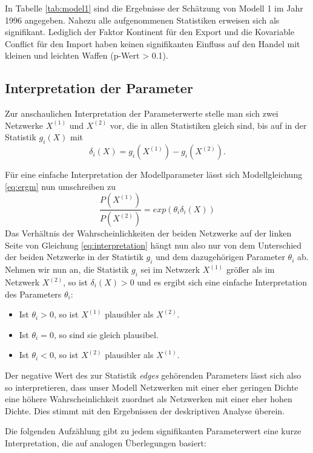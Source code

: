 \documentclass[a4paper,ngerman,oneside,titlepage,bibliography=totoc,11pt]{scrreprt}
\begin{document}
In Tabelle \ref{tab:model1} sind die Ergebnisse der Schätzung von Modell 1 im Jahr 1996 angegeben. Nahezu alle aufgenommenen Statistiken erweisen sich als signifikant. Lediglich der Faktor Kontinent für den Export und die Kovariable Conflict für den Import haben keinen signifikanten Einfluss auf den Handel mit kleinen und leichten Waffen (p-Wert > 0.1).

\subsection{Interpretation der Parameter}
Zur anschaulichen Interpretation der Parameterwerte stelle man sich zwei Netzwerke $X^{(1)}$ und $X^{(2)}$ vor, die in allen Statistiken gleich sind, bis auf in der Statistik $g_i(X)$ mit
$$\delta_i(X) = g_i(X^{(1)}) - g_i(X^{(2)}).$$


Für eine einfache Interpretation der Modellparameter lässt sich Modellgleichung \ref{eq:ergm} nun umschreiben zu 
\begin{equation}
\frac{P(X^{(1)})}{P(X^{(2)})} = exp(\theta_i \delta_i(X))
	\label{eq:interpretation}
\end{equation}
Das Verhältnis der Wahrscheinlichkeiten der beiden Netzwerke auf der linken Seite von Gleichung \ref{eq:interpretation} hängt nun also nur von dem Unterschied der beiden Netzwerke in der Statistik $g_i$ und dem dazugehörigen Parameter $\theta_i$ ab. Nehmen wir nun an, die Statistik $g_i$ sei im Netwzerk $X^{(1)}$ größer als im Netzwerk $X^{(2)}$, so ist $\delta_i(X) > 0$ und es ergibt sich eine einfache Interpretation des Parameters $\theta_i$:
	\begin{itemize}
		\item Ist $\theta_i > 0$, so ist $X^{(1)}$ plausibler als $X^{(2)}$.
		\item Ist $\theta_i = 0$, so sind sie gleich plausibel.
		\item Ist $\theta_i < 0$, so ist $X^{(2)}$ plausibler als $X^{(1)}$.
	\end{itemize} 
Der negative Wert des zur Statistik \emph{edges} gehörenden Parameters lässt sich also so interpretieren, dass unser Modell Netzwerken mit einer eher geringen Dichte eine höhere Wahrscheinlichkeit zuordnet als Netzwerken mit einer eher hohen Dichte. Dies stimmt mit den Ergebnissen der deskriptiven Analyse überein.  

Die folgenden Aufzählung gibt zu jedem signifikanten Parameterwert eine kurze Interpretation,      die auf analogen Überlegungen basiert:
\end{document}
